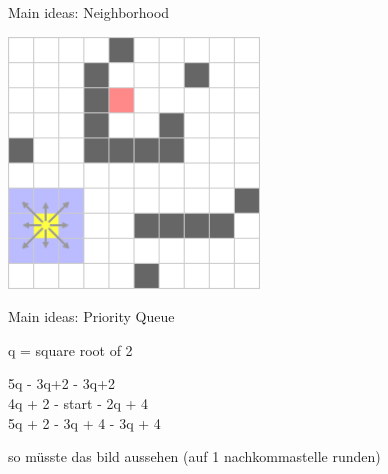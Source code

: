 \documentclass{presentation}
\begin{document}
\begin{frame}
\end{frame}


\begin{frame}{Main ideas: Neighborhood}
	\begin{center}
		\includegraphics[width=0.5\textwidth]{figures/A-Stern_geschnitten(241x241)/2.png}
	\end{center}
\end{frame}


\begin{frame}{Main ideas: Priority Queue}


	q = square root of 2
	\vspace{1cm}

	5q - 3q+2 - 3q+2\\
	4q + 2 - start - 2q + 4\\
	5q + 2 - 3q + 4 - 3q + 4

	\vspace{1cm}
	so müsste das bild aussehen (auf 1 nachkommastelle runden)
\end{frame}
\end{document}
